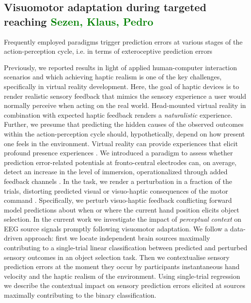 \subsection{Visuomotor adaptation during targeted reaching \textcolor{green}{Sezen, Klaus, Pedro}}

Frequently employed paradigms trigger prediction errors at various stages of the action-perception cycle, i.e. in terms of exteroceptive prediction errors \cites{cohen, cavahang, mmn_stuff}

Previously, we reported results in light of applied human-computer interaction scenarios and which achieving haptic realism is one of the key challenges, specifically in virtual reality development. Here, the goal of haptic devices is to render realistic sensory feedback that mimics the sensory experience a user would normally perceive when acting on the real world. Head-mounted virtual reality in combination with expected haptic feedback renders a \textit{naturalistic} experience. Further, we presume that predicting the hidden causes of the observed outcomes within the action-perception cycle should, hypothetically, depend on how present one feels in the environment. Virtual reality can provide experiences that elicit profound presence experiences \cite{}. We introduced a paradigm to assess whether prediction error-related potentials at fronto-central electrodes can, on average, detect an increase in the level of immersion, operationalized through added feedback channels \cite{Gehrke_2019}. In the task, we render a perturbation in a fraction of the trials, distorting predicted visual or visuo-haptic consequences of the motor command \cite{oddball}. Specifically, we perturb visuo-haptic feedback conflicting forward model predictions about when or where the current hand position elicits object selection. In the current work we investigate the impact of \textit{perceptual context} on EEG source signals promptly following visuomotor adaptation. We follow a data-driven approach: first we locate independent brain sources maximally contributing to a single-trial linear classification between predicted and perturbed sensory outcomes in an object selection task. Then we contextualise sensory prediction errors at the moment they occur by participants instantaneous hand velocity and the haptic realism of the environment. Using single-trial regression we describe the contextual impact on sensory prediction errors elicited at sources maximally contributing to the binary classification.



